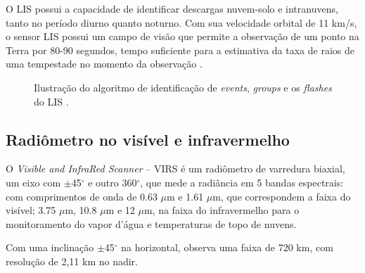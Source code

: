 O LIS possui a capacidade de identificar descargas nuvem-solo e intranuvens, tanto no período diurno quanto noturno.  Com sua velocidade orbital de 11 km/s, o sensor LIS possui um campo de visão que permite a observação de um ponto na Terra por 80-90 segundos, tempo suficiente para a estimativa da taxa de raios de uma tempestade no momento da observação \cite{christianTM,trmmhandbook}.


\begin{figure}[!ht]
\caption{Ilustração do algoritmo de identificação de \textit{events}, \textit{groups} e os \textit{flashes}  do LIS \cite{christian2000LISalgorithm}.}
\label{LisImagemProcessa} 
\end{figure} 



\subsection{Radiômetro no visível e infravermelho}

O \textit{Visible and InfraRed Scanner} -- VIRS é um radiômetro de varredura biaxial, um eixo com $\pm$45$^{\circ}$ e outro 360$^{\circ}$, que mede a radiância em 5 bandas espectrais: com comprimentos de onda de 0.63 $\mu$m e  1.61 $\mu$m, que correspondem a faixa do visível; 3.75 $\mu$m, 10.8 $\mu$m e 12 $\mu$m, na faixa do infravermelho para o monitoramento do vapor d'água e temperaturas de topo de nuvens. 

Com uma inclinação $\pm$45$^{\circ}$ na horizontal, observa uma faixa de 720 km, com resolução de 2,11 km no nadir\cite{kummerok1998,trmmhandbook}.



